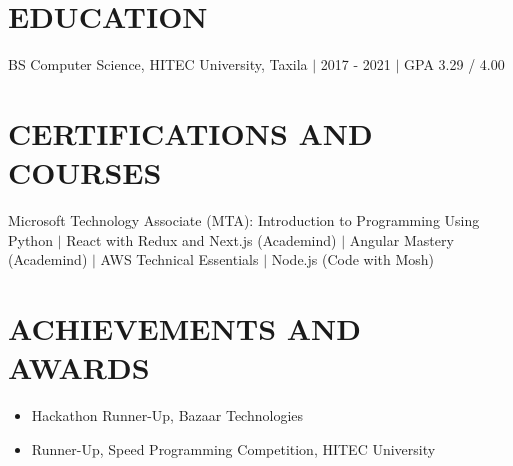 \documentclass[letterpaper,11pt]{article}
\newcommand{\resumeItem}[1]{\item\small{#1\vspace{-2pt}}}
\newcommand{\resumeBulletsStart}{\begin{itemize}[leftmargin=0.3in]}
\newcommand{\resumeBulletsEnd}{\end{itemize}\vspace{-4pt}}
\begin{document}
\section{EDUCATION}
\small BS Computer Science, HITEC University, Taxila $|$ 2017 - 2021 $|$ GPA 3.29 / 4.00

\section{CERTIFICATIONS AND COURSES}
\small Microsoft Technology Associate (MTA): Introduction to Programming Using Python $|$
React with Redux and Next.js (Academind) $|$ Angular Mastery (Academind) $|$
AWS Technical Essentials $|$ Node.js (Code with Mosh)

\section{ACHIEVEMENTS AND AWARDS}
\resumeBulletsStart
    \resumeItem{Hackathon Runner-Up, Bazaar Technologies}
    \resumeItem{Runner-Up, Speed Programming Competition, HITEC University}
\resumeBulletsEnd
\end{document}
